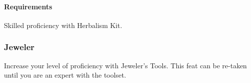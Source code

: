     \paragraph{Requirements} Skilled proficiency with Herbalism Kit.

\subsubsection{Jeweler} \label{feat::jeweler}
    Increase your level of proficiency with Jeweler's Tools.
    This feat can be re-taken until you are an expert with the toolset.

